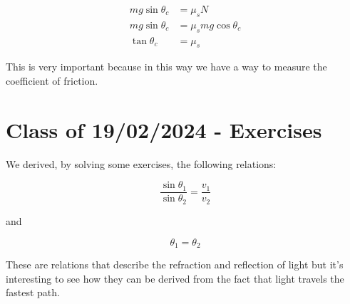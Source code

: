 \documentclass[10pt]{extarticle}
\begin{document}
\begin{align*}
  mg \sin \theta_c & = \mu_s N                \\
  mg \sin \theta_c & = \mu_s mg \cos \theta_c \\
  \tan \theta_c    & = \mu_s
\end{align*}

This is very important because in this way we have a way to measure the coefficient of friction.

\section{Class of 19/02/2024 - Exercises}

We derived, by solving some exercises, the following relations:

$$
  \frac{\sin \theta_1}{\sin \theta_2} = \frac{v_1}{v_2}
$$

and

$$
  \theta_1 = \theta_2
$$

These are relations that describe the refraction and reflection of light but it's interesting to see how they can be derived from the fact that light travels the fastest path.
\end{document}

